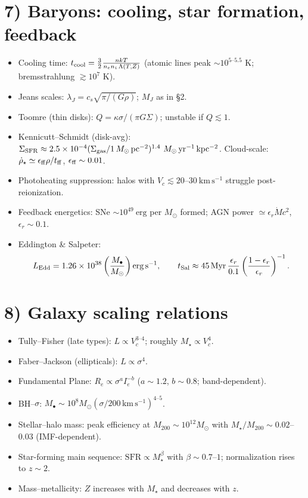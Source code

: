 \documentclass[11pt,a4paper]{article}
\begin{document}
\section*{7) Baryons: cooling, star formation, feedback}
\begin{itemize}
\item Cooling time: $t_{\rm cool}=\frac{3}{2}\frac{n kT}{n_e n_i\,\Lambda(T,Z)}$
(atomic lines peak $\sim 10^{5\text{--}5.5}$ K; bremsstrahlung $\gtrsim 10^7$ K).
\item Jeans scales: $\lambda_J=c_s\sqrt{\pi/(G\rho)}$;\; $M_J$ as in \S2.
\item Toomre (thin disks): $Q=\kappa\sigma/(\pi G\Sigma)$; unstable if $Q\lesssim 1$.
\item Kennicutt--Schmidt (disk-avg):
$\Sigma_{\rm SFR}\approx 2.5\times10^{-4}
(\Sigma_{\rm gas}/1\,M_\odot\,\mathrm{pc}^{-2})^{1.4}
\ M_\odot\,\mathrm{yr^{-1}\,kpc^{-2}}$.
Cloud-scale: $\dot\rho_\star\simeq \epsilon_{\rm ff}\rho/t_{\rm ff}$, $\epsilon_{\rm ff}\sim 0.01$.
\item Photoheating suppression: halos with $V_c\lesssim 20$--$30\ \mathrm{km\,s^{-1}}$ struggle post-reionization.
\item Feedback energetics: SNe $\sim 10^{49}\ \mathrm{erg}$ per $M_\odot$ formed; 
AGN power $\simeq \epsilon_r \dot M c^2$, $\epsilon_r\sim 0.1$.
\item Eddington \& Salpeter:
\[
L_{\rm Edd}=1.26\times 10^{38}\left(\frac{M_\bullet}{M_\odot}\right)\mathrm{erg\,s^{-1}},\qquad
t_{\rm Sal}\approx 45\,\mathrm{Myr}\,\frac{\epsilon_r}{0.1}\left(\frac{1-\epsilon_r}{\epsilon_r}\right)^{-1}.
\]
\end{itemize}

\section*{8) Galaxy scaling relations}
\begin{itemize}
\item Tully--Fisher (late types): $L\propto V_c^{3\text{--}4}$; roughly $M_\star\propto V_c^4$.
\item Faber--Jackson (ellipticals): $L\propto \sigma^{4}$.
\item Fundamental Plane: $R_e\propto \sigma^a I_e^{-b}$ ($a\sim 1.2$, $b\sim 0.8$; band-dependent).
\item BH--$\sigma$: $M_\bullet\sim 10^8 M_\odot (\sigma/200\,\mathrm{km\,s^{-1}})^{4\text{--}5}$.
\item Stellar--halo mass: peak efficiency at $M_{200}\sim 10^{12}M_\odot$ with $M_\star/M_{200}\sim 0.02$--$0.03$ (IMF-dependent).
\item Star-forming main sequence: $\mathrm{SFR}\propto M_\star^\beta$ with $\beta\sim 0.7$--$1$; normalization rises to $z\sim 2$.
\item Mass--metallicity: $Z$ increases with $M_\star$ and decreases with $z$.
\end{itemize}
\end{document}
